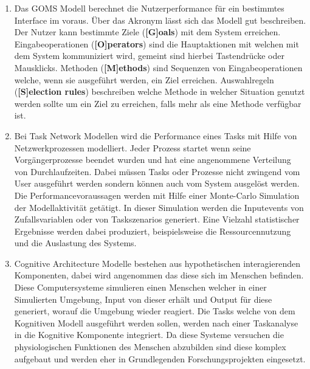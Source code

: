 \documentclass[draft=false
              ,paper=a4
              ,twoside=false
              ,fontsize=11pt
              ,headsepline
              ,BCOR10mm
              ,DIV11
              ]{scrbook}
\begin{document}
\begin{enumerate}
  \item Das GOMS Modell berechnet die Nutzerperformance für ein bestimmtes Interface im voraus. Über das Akronym lässt sich das Modell gut beschreiben. Der Nutzer kann bestimmte Ziele (\textbf{[G]oals}) mit dem System erreichen. Eingabeoperationen (\textbf{[O]perators}) sind die Hauptaktionen mit welchen mit dem System kommuniziert wird, gemeint sind hierbei Tastendrücke oder Mausklicks. Methoden (\textbf{[M]ethods}) sind Sequenzen von Eingabeoperationen welche, wenn sie ausgeführt werden, ein Ziel erreichen. Auswahlregeln (\textbf{[S]election rules}) beschreiben welche Methode in welcher Situation genutzt werden sollte um ein Ziel zu erreichen, falls mehr als eine Methode verfügbar ist.
  \item Bei Task Network Modellen wird die Performance eines Tasks mit Hilfe von Netzwerkprozessen modelliert. Jeder Prozess startet wenn seine Vorgängerprozesse beendet wurden und hat eine angenommene Verteilung von Durchlaufzeiten. Dabei müssen Tasks oder Prozesse nicht zwingend vom User ausgeführt werden sondern können auch vom System ausgelöst werden. Die Performancevoraussagen werden mit Hilfe einer Monte-Carlo Simulation der Modellaktivität getätigt. In dieser Simulation werden die Inputevents von Zufallsvariablen oder von Taskszenarios generiert. Eine Vielzahl statistischer Ergebnisse werden dabei produziert, beispielsweise die Ressourcennutzung und die Auslastung des Systems.
  \item Cognitive Architecture Modelle bestehen aus hypothetischen interagierenden Komponenten, dabei wird angenommen das diese sich im Menschen befinden. Diese Computersysteme simulieren einen Menschen welcher in einer Simulierten Umgebung, Input von dieser erhält und Output für diese generiert, worauf die Umgebung wieder reagiert. Die Tasks welche von dem Kognitiven Modell ausgeführt werden sollen, werden nach einer Taskanalyse in die Kognitive Komponente integriert. Da diese Systeme versuchen die physiologischen Funktionen des Menschen abzubilden sind diese komplex aufgebaut und werden eher in Grundlegenden Forschungsprojekten eingesetzt.
\end{enumerate}
\end{document}
